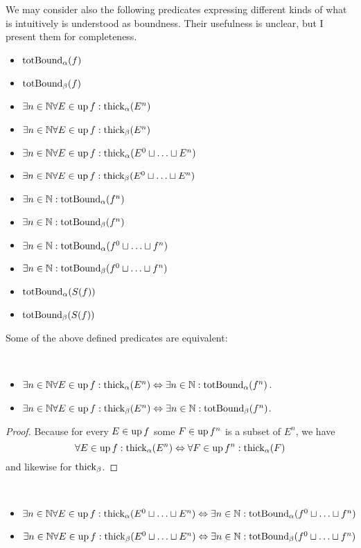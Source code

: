 We may consider also the following predicates expressing different
kinds of what is intuitively is understood as boundness. Their usefulness
is unclear, but I present them for completeness.
\begin{itemize}
\item $\operatorname{totBound}_{\alpha}(f)$
\item $\operatorname{totBound}_{\beta}(f)$
\item $\exists n\in\mathbb{N}\forall E\in\operatorname{up} f:\operatorname{thick}_{\alpha}(E^{n})$
\item $\exists n\in\mathbb{N}\forall E\in\operatorname{up} f:\operatorname{thick}_{\beta}(E^{n})$
\item $\exists n\in\mathbb{N}\forall E\in\operatorname{up} f:\operatorname{thick}_{\alpha}(E^{0}\sqcup\ldots\sqcup E^{n})$
\item $\exists n\in\mathbb{N}\forall E\in\operatorname{up} f:\operatorname{thick}_{\beta}(E^{0}\sqcup\ldots\sqcup E^{n})$
\item $\exists n\in\mathbb{N}:\operatorname{totBound}_{\alpha}(f^{n})$
\item $\exists n\in\mathbb{N}:\operatorname{totBound}_{\beta}(f^{n})$
\item $\exists n\in\mathbb{N}:\operatorname{totBound}_{\alpha}(f^{0}\sqcup\ldots\sqcup f^{n})$
\item $\exists n\in\mathbb{N}:\operatorname{totBound}_{\beta}(f^{0}\sqcup\ldots\sqcup f^{n})$
\item $\operatorname{totBound}_{\alpha}(S(f))$
\item $\operatorname{totBound}_{\beta}(S(f))$
\end{itemize}
Some of the above defined predicates are equivalent:
\begin{prop}
~
\begin{itemize}
\item $\exists n\in\mathbb{N}\forall E\in\operatorname{up} f:\operatorname{thick}_{\alpha}(E^{n})\Leftrightarrow\exists n\in\mathbb{N}:\operatorname{totBound}_{\alpha}(f^{n})$.
\item $\exists n\in\mathbb{N}\forall E\in\operatorname{up} f:\operatorname{thick}_{\beta}(E^{n})\Leftrightarrow\exists n\in\mathbb{N}:\operatorname{totBound}_{\beta}(f^{n})$.
\end{itemize}
\end{prop}
\begin{proof}
Because for every $E\in\operatorname{up} f$ some $F\in\operatorname{up} f^{n}$ is a subset of $E^{n}$, we have
\[\forall E\in\operatorname{up} f:\operatorname{thick}_{\alpha}(E^{n})\Leftrightarrow\forall F\in\operatorname{up} f^n:\operatorname{thick}_{\alpha}(F)\]
and likewise for $\operatorname{thick}_{\beta}$.\end{proof}
\begin{prop}
~
\begin{itemize}
\item $\exists n\in\mathbb{N}\forall E\in\operatorname{up} f:\operatorname{thick}_{\alpha}(E^{0}\sqcup\ldots\sqcup E^{n})\Leftrightarrow\exists n\in\mathbb{N}:\operatorname{totBound}_{\alpha}(f^{0}\sqcup\ldots\sqcup f^{n})$
\item $\exists n\in\mathbb{N}\forall E\in\operatorname{up} f:\operatorname{thick}_{\beta}(E^{0}\sqcup\ldots\sqcup E^{n})\Leftrightarrow\exists n\in\mathbb{N}:\operatorname{totBound}_{\beta}(f^{0}\sqcup\ldots\sqcup f^{n})$
\end{itemize}
\end{prop}
